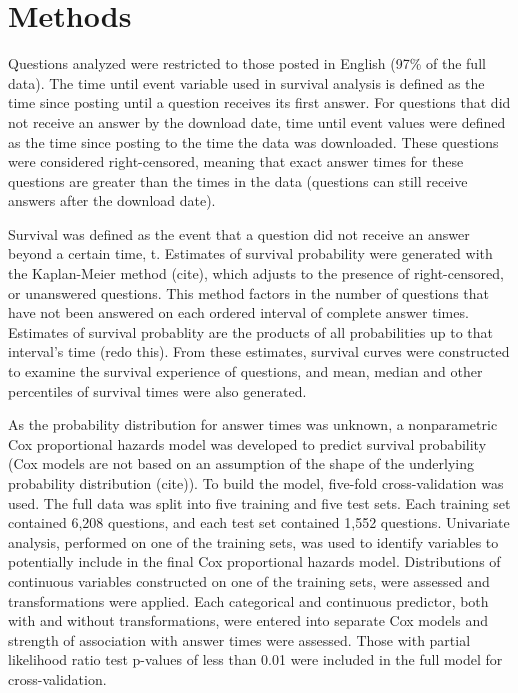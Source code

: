 \documentclass[12pt]{article}
\begin{document}
\section{Methods}

    Questions analyzed were restricted to those posted in English (97\% of the full data). The time until event variable used in survival analysis is defined as the time since posting until a question receives its first answer. For questions that did not receive an answer by the download date, time until event values were defined as the time since posting to the time the data was downloaded. These questions were considered right-censored, meaning that exact answer times for these questions are greater than the times in the data (questions can still receive answers after the download date). 

Survival was defined as the event that a question did not receive an answer beyond a certain time, t. Estimates of survival probability were generated with the Kaplan-Meier method (cite), which adjusts to the presence of right-censored, or unanswered questions. This method factors in the number of questions that have not been answered on each ordered interval of complete answer times. Estimates of survival probablity are the products of all probabilities up to that interval's time (redo this). From these estimates, survival curves were constructed to examine the survival experience of questions, and mean, median and other percentiles of survival times were also generated. 

As the probability distribution for answer times was unknown, a nonparametric Cox proportional hazards model was developed to predict survival probability (Cox models are not based on an assumption of the shape of the underlying probability distribution (cite)). To build the model, five-fold cross-validation was used. The full data was split into five training and five test sets. Each training set contained 6,208 questions, and each test set contained 1,552 questions. Univariate analysis, performed on one of the training sets, was used to identify variables to potentially include in the final Cox proportional hazards model. Distributions of continuous variables constructed on one of the training sets, were assessed and transformations were applied. Each categorical and continuous predictor, both with and without transformations, were entered into separate Cox models and strength of association with answer times were assessed. Those with partial likelihood ratio test p-values of less than 0.01 were included in the full model for cross-validation.
\end{document}
